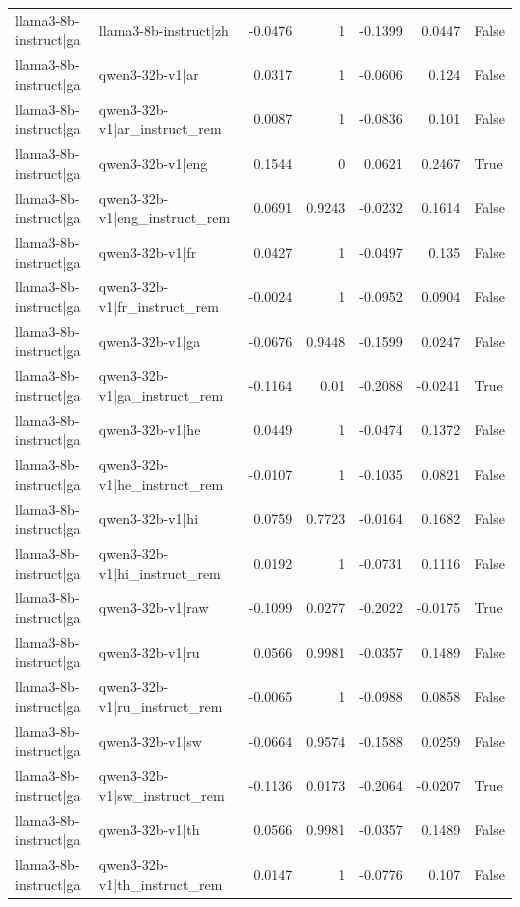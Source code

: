 \begin{table}
\begin{tabular}{l l r r r r l}
llama3-8b-instruct|ga & llama3-8b-instruct|zh & -0.0476 & 1 & -0.1399 & 0.0447 & False \\
llama3-8b-instruct|ga & qwen3-32b-v1|ar & 0.0317 & 1 & -0.0606 & 0.124 & False \\
llama3-8b-instruct|ga & qwen3-32b-v1|ar_instruct_rem & 0.0087 & 1 & -0.0836 & 0.101 & False \\
llama3-8b-instruct|ga & qwen3-32b-v1|eng & 0.1544 & 0 & 0.0621 & 0.2467 & True \\
llama3-8b-instruct|ga & qwen3-32b-v1|eng_instruct_rem & 0.0691 & 0.9243 & -0.0232 & 0.1614 & False \\
llama3-8b-instruct|ga & qwen3-32b-v1|fr & 0.0427 & 1 & -0.0497 & 0.135 & False \\
llama3-8b-instruct|ga & qwen3-32b-v1|fr_instruct_rem & -0.0024 & 1 & -0.0952 & 0.0904 & False \\
llama3-8b-instruct|ga & qwen3-32b-v1|ga & -0.0676 & 0.9448 & -0.1599 & 0.0247 & False \\
llama3-8b-instruct|ga & qwen3-32b-v1|ga_instruct_rem & -0.1164 & 0.01 & -0.2088 & -0.0241 & True \\
llama3-8b-instruct|ga & qwen3-32b-v1|he & 0.0449 & 1 & -0.0474 & 0.1372 & False \\
llama3-8b-instruct|ga & qwen3-32b-v1|he_instruct_rem & -0.0107 & 1 & -0.1035 & 0.0821 & False \\
llama3-8b-instruct|ga & qwen3-32b-v1|hi & 0.0759 & 0.7723 & -0.0164 & 0.1682 & False \\
llama3-8b-instruct|ga & qwen3-32b-v1|hi_instruct_rem & 0.0192 & 1 & -0.0731 & 0.1116 & False \\
llama3-8b-instruct|ga & qwen3-32b-v1|raw & -0.1099 & 0.0277 & -0.2022 & -0.0175 & True \\
llama3-8b-instruct|ga & qwen3-32b-v1|ru & 0.0566 & 0.9981 & -0.0357 & 0.1489 & False \\
llama3-8b-instruct|ga & qwen3-32b-v1|ru_instruct_rem & -0.0065 & 1 & -0.0988 & 0.0858 & False \\
llama3-8b-instruct|ga & qwen3-32b-v1|sw & -0.0664 & 0.9574 & -0.1588 & 0.0259 & False \\
llama3-8b-instruct|ga & qwen3-32b-v1|sw_instruct_rem & -0.1136 & 0.0173 & -0.2064 & -0.0207 & True \\
llama3-8b-instruct|ga & qwen3-32b-v1|th & 0.0566 & 0.9981 & -0.0357 & 0.1489 & False \\
llama3-8b-instruct|ga & qwen3-32b-v1|th_instruct_rem & 0.0147 & 1 & -0.0776 & 0.107 & False \\

\end{tabular}
\end{table}
